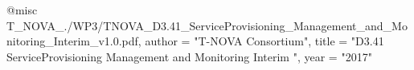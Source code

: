 @misc{ T_NOVA_./WP3/TNOVA_D3.41_ServiceProvisioning_Management_and_Monitoring_Interim_v1.0.pdf,
       author = "{T-NOVA Consortium}",
       title = "D3.41 ServiceProvisioning Management and Monitoring Interim ",
       year = "2017" }
